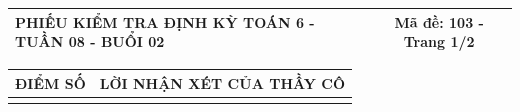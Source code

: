\documentclass[12pt,a4paper]{article}
\begin{document}
\newpage


\noindent
\begin{tabularx}{\linewidth}{|X|c|}
\hline
\textbf{PHIẾU KIỂM TRA ĐỊNH KỲ TOÁN 6 - TUẦN 08 - BUỔI 02} & \textbf{Mã đề: 103 - Trang 1/2} \\
\hline
\end{tabularx}

\vspace{1mm}

\noindent
\begin{tabularx}{\linewidth}{|p{3.2cm}|X|}
\hline
\centering\textbf{ĐIỂM SỐ} & \centering\textbf{LỜI NHẬN XÉT CỦA THẦY CÔ} \tabularnewline
\hline
\rule{0pt}{1.8cm} & \tabularnewline
\hline
\end{tabularx}

\vspace{1.2mm}
\end{document}
